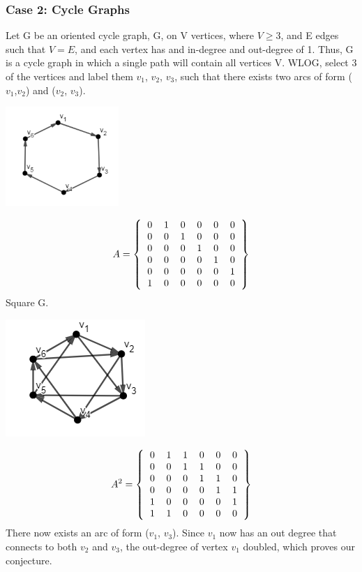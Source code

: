 \documentclass{article}
\begin{document}
\subsubsection{Case 2: Cycle Graphs}
\begin{flushleft}
Let G be an oriented cycle graph, G, on V vertices, where $V\geq3$, and E edges such that $V = E$, and each vertex has and in-degree and out-degree of 1. Thus, G is a cycle graph in which a single path will contain all vertices V.
WLOG, select 3 of the vertices and label them $v_1$, $v_2$, $v_3$, such that there exists two arcs of form ($v_1$,$v_2$) and ($v_2$, $v_3$).
\begin{center}
\includegraphics{cycle6.PNG}
\end{center}
\begin{equation}
A  =
\left \{
  \begin{tabular}{cccccc}
  0 & 1 & 0 & 0 & 0 & 0 \\
  0 & 0 & 1 & 0 & 0 & 0 \\
  0 & 0 & 0 & 1 & 0 & 0 \\
  0 & 0 & 0 & 0 & 1 & 0 \\
  0 & 0 & 0 & 0 & 0 & 1 \\
  1 & 0 & 0 & 0 & 0 & 0 \\
  \end{tabular}
\right \}
\end{equation}
Square G.
\begin{center}
\includegraphics{cycle6square.PNG}
\end{center}
\begin{equation} 
A^2 =
\left \{
  \begin{tabular}{cccccc}
  0 & 1 & 1 & 0 & 0 & 0 \\
  0 & 0 & 1 & 1 & 0 & 0 \\
  0 & 0 & 0 & 1 & 1 & 0 \\
  0 & 0 & 0 & 0 & 1 & 1 \\
  1 & 0 & 0 & 0 & 0 & 1 \\
  1 & 1 & 0 & 0 & 0 & 0 \\
  \end{tabular}
\right \}
\end{equation}
There now exists an arc of form ($v_1$, $v_3$).
Since $v_1$ now has an out degree that connects to both $v_2$ and $v_3$, the out-degree of vertex $v_1$ doubled, which proves our conjecture.\break
\end{flushleft}
\end{document}
